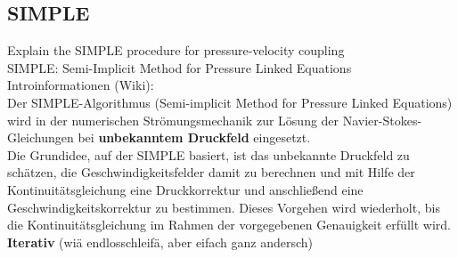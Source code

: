 \documentclass[a4paper]{scrartcl}
\begin{document}
\subsection{SIMPLE}
\label{sec:SIMPLE}
Explain the SIMPLE procedure for pressure-velocity coupling\\
\newline
SIMPLE: Semi-Implicit Method for Pressure Linked Equations\\
Introinformationen (Wiki):\\
Der SIMPLE-Algorithmus (Semi-implicit Method for Pressure Linked Equations) wird
in der numerischen Strömungsmechanik zur Lösung der Navier-Stokes-Gleichungen
bei \textbf{unbekanntem Druckfeld} eingesetzt.\\
Die Grundidee, auf der SIMPLE basiert, ist das unbekannte Druckfeld zu schätzen,
die Geschwindigkeitsfelder damit zu berechnen und mit Hilfe der
Kontinuitätsgleichung eine Druckkorrektur und anschließend eine
Geschwindigkeitskorrektur zu bestimmen. Dieses Vorgehen wird wiederholt, bis die
Kontinuitätsgleichung im Rahmen der vorgegebenen Genauigkeit erfüllt wird.\\
\textbf{Iterativ} (wiä endlosschleifä, aber eifach ganz andersch)\\
\end{document}
